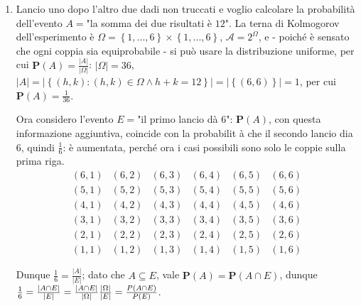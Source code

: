 \documentclass{article}
\begin{document}
\begin{enumerate}
\item Lancio uno dopo l'altro due dadi non truccati e voglio calcolare la
probabilit\`{a} dell'evento $A=$"la somma dei due risultati \`{e} $12$". La
terna di Kolmogorov dell'esperimento \`{e} $\Omega =\left\{ 1,...,6\right\}
\times \left\{ 1,...,6\right\} $, $\mathcal{A}=2^{\Omega }$, e - poich\'{e} 
\`{e} sensato che ogni coppia sia equiprobabile - si pu\`{o} usare la
distribuzione uniforme, per cui $\mathbf{P}\left( A\right) =\frac{\left\vert
A\right\vert }{\left\vert \Omega \right\vert }$: $\left\vert \Omega
\right\vert =36$, $\left\vert A\right\vert =\left\vert \left\{ \left(
h,k\right) :\left( h,k\right) \in \Omega \wedge h+k=12\right\} \right\vert
=\left\vert \left\{ \left( 6,6\right) \right\} \right\vert =1$, per cui $%
\mathbf{P}\left( A\right) =\frac{1}{36}$.

Ora considero l'evento $E=$"il primo lancio d\`{a} $6$": $\mathbf{P}\left(
A\right) $, con questa informazione aggiuntiva, coincide con la probabilit%
\`{a} che il secondo lancio dia $6$, quindi $\frac{1}{6}$: \`{e} aumentata,
perch\'{e} ora i casi possibili sono solo le coppie sulla prima riga.%
\begin{equation*}
\begin{array}{cccccc}
\left( 6,1\right) & \left( 6,2\right) & \left( 6,3\right) & \left( 6,4\right)
& \left( 6,5\right) & \left( 6,6\right) \\ 
\left( 5,1\right) & \left( 5,2\right) & \left( 5,3\right) & \left( 5,4\right)
& \left( 5,5\right) & \left( 5,6\right) \\ 
\left( 4,1\right) & \left( 4,2\right) & \left( 4,3\right) & \left( 4,4\right)
& \left( 4,5\right) & \left( 4,6\right) \\ 
\left( 3,1\right) & \left( 3,2\right) & \left( 3,3\right) & \left( 3,4\right)
& \left( 3,5\right) & \left( 3,6\right) \\ 
\left( 2,1\right) & \left( 2,2\right) & \left( 2,3\right) & \left( 2,4\right)
& \left( 2,5\right) & \left( 2,6\right) \\ 
\left( 1,1\right) & \left( 1,2\right) & \left( 1,3\right) & \left( 1,4\right)
& \left( 1,5\right) & \left( 1,6\right)%
\end{array}%
\end{equation*}

Dunque $\frac{1}{6}=\frac{\left\vert A\right\vert }{\left\vert E\right\vert }
$; dato che $A\subseteq E$, vale $\mathbf{P}\left( A\right) =\mathbf{P}%
\left( A\cap E\right) $, dunque $\frac{1}{6}=\frac{\left\vert A\cap
E\right\vert }{\left\vert E\right\vert }=\frac{\left\vert A\cap E\right\vert 
}{\left\vert \Omega \right\vert }\frac{\left\vert \Omega \right\vert }{%
\left\vert E\right\vert }=\frac{P\left( A\cap E\right) }{P\left( E\right) }$.
\end{enumerate}
\end{document}

